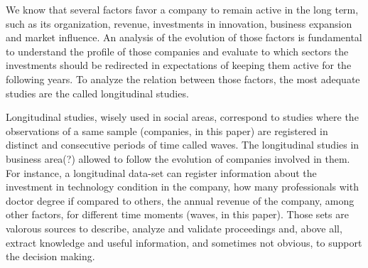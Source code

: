 \documentclass[a4paper,twoside]{article}
\begin{document}
We know that several factors favor a company to remain active in the long term, such as its organization, revenue, investments in innovation, business expansion and market influence. An analysis of the evolution of those factors is fundamental to understand the profile of those companies and evaluate to which sectors the investments should be redirected in expectations of keeping them active for the following years. To analyze the relation between those factors, the most adequate studies are the called longitudinal studies.

Longitudinal studies, wisely used in social areas, correspond to studies where the observations of a same sample (companies, in this paper) are registered in distinct and consecutive periods of time called waves. The longitudinal studies in business area(?) allowed to follow the evolution of companies involved in them. For instance, a longitudinal data-set can register information about the investment in technology condition in the company, how many professionals with doctor degree if compared to others, the annual revenue of the company, among other factors, for different time moments (waves, in this paper). Those sets are valorous sources to describe, analyze and validate proceedings and, above all, extract knowledge and useful information, and sometimes not obvious, to support the decision making.
\end{document}
